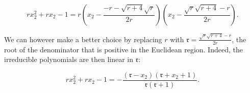 \begin{equation}
  r x_2^2+r
   x_2-1  = r \left(x_2-\frac{-r-\sqrt{r+4} \sqrt{r}}{2 r}\right)
   \left(x_2-\frac{\sqrt{r} \sqrt{r+4}-r}{2 r}\right).
\end{equation}

We can however make a better choice by replacing $r$ with $\mathfrak{r}=\frac{\sqrt{r} \sqrt{r+4}-r}{2 r}$, the root of the denominator that is positive in the Euclidean region. Indeed, the irreducible polynomials are then linear in $\mathfrak{r}$:

  \begin{equation}
    r x_2^2+r
     x_2-1  = -\frac{\left(\mathfrak{r}-x_2\right)
   \left(\mathfrak{r}+x_2+1\right)}{\mathfrak{r} (\mathfrak{r}+1)}.
  \end{equation}

